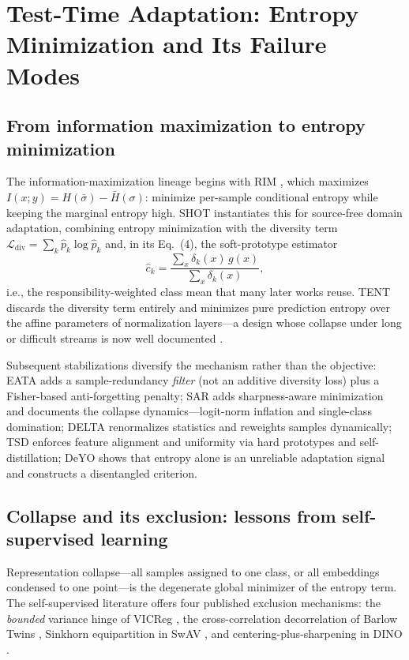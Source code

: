 \documentclass[preprint,12pt]{elsarticle}
\begin{document}
\section{Test-Time Adaptation: Entropy Minimization and Its Failure Modes}
\label{sec:tta}

\subsection{From information maximization to entropy minimization}

The information-maximization lineage begins with RIM \citep{gomes2010rim}, which maximizes $I(x;y) = H(\bar\sigma) - \bar H(\sigma)$: minimize per-sample conditional entropy while keeping the marginal entropy high. SHOT \citep{liang2020shot} instantiates this for source-free domain adaptation, combining entropy minimization with the diversity term $\mathcal{L}_{\mathrm{div}} = \sum_k \hat p_k \log \hat p_k$ and, in its Eq.~(4), the soft-prototype estimator
\begin{equation}
\hat{c}_k = \frac{\sum_{x} \delta_k(x)\, g(x)}{\sum_{x} \delta_k(x)},
\label{eq:softproto}
\end{equation}
i.e., the responsibility-weighted class mean that many later works reuse. TENT \citep{wang2021tent} discards the diversity term entirely and minimizes pure prediction entropy over the affine parameters of normalization layers---a design whose collapse under long or difficult streams is now well documented \citep{niu2023sar}.

Subsequent stabilizations diversify the mechanism rather than the objective: EATA \citep{niu2022eata} adds a sample-redundancy \emph{filter} (not an additive diversity loss) plus a Fisher-based anti-forgetting penalty; SAR \citep{niu2023sar} adds sharpness-aware minimization and documents the collapse dynamics---logit-norm inflation and single-class domination; DELTA \citep{zhao2023delta} renormalizes statistics and reweights samples dynamically; TSD \citep{wang2023tsd} enforces feature alignment and uniformity via hard prototypes and self-distillation; DeYO \citep{lee2024deyo} shows that entropy alone is an unreliable adaptation signal and constructs a disentangled criterion.

\subsection{Collapse and its exclusion: lessons from self-supervised learning}

Representation collapse---all samples assigned to one class, or all embeddings condensed to one point---is the degenerate global minimizer of the entropy term. The self-supervised literature offers four published exclusion mechanisms: the \emph{bounded} variance hinge of VICReg \citep{bardes2022vicreg}, the cross-correlation decorrelation of Barlow Twins \citep{zbontar2021barlow}, Sinkhorn equipartition in SwAV \citep{caron2020swav}, and centering-plus-sharpening in DINO \citep{caron2021dino}.
\end{document}
